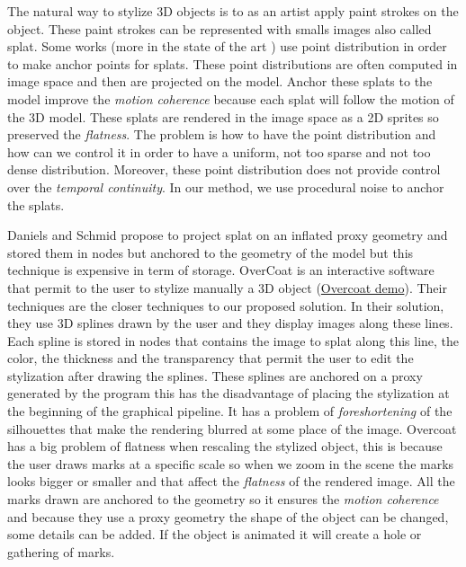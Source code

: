 The natural way to stylize 3D objects is to as an artist apply paint strokes on the object. These paint strokes can be represented with smalls images also called splat. Some works \cite{meier_painterly_1996, Fekete_2000, chi_stylized_2006}(more in the state of the art \cite{benard_state---art_2011}) use point distribution in order to make anchor points for splats. These point distributions are often computed in image space and then are projected on the model. Anchor these splats to the model improve the \textit{motion coherence} because each splat will follow the motion of the 3D model. These splats are rendered in the image space as a 2D sprites so preserved the \textit{flatness}. The problem is how to have the point distribution and how can we control it in order to have a uniform, not too sparse and not too dense distribution. Moreover, these point distribution does not provide control over the \textit{temporal continuity}. In our method, we use procedural noise to anchor the splats.

Daniels\cite{Daniels_1999} and Schmid\cite{schmid_overcoat:_2011} propose to project splat on an inflated proxy geometry and stored them in nodes but anchored to the geometry of the model but this technique is expensive in term of storage. OverCoat\cite{schmid_overcoat:_2011} is an interactive software that permit to the user to stylize manually a 3D object (\href{https://www.youtube.com/watch?v=Nfw6JxC9Fw4}{Overcoat demo}). Their techniques are the closer techniques to our proposed solution. In their solution, they use 3D splines drawn by the user and they display images along these lines. Each spline is stored in nodes that contains the image to splat along this line, the color, the thickness and the transparency that permit the user to edit the stylization after drawing the splines. These splines are anchored on a proxy generated by the program this has the disadvantage of placing the stylization at the beginning of the graphical pipeline. It has a problem of \textit{foreshortening} of the silhouettes that make the rendering blurred at some place of the image. Overcoat has a big problem of flatness when rescaling the stylized object, this is because the user draws marks at a specific scale so when we zoom in the scene the marks looks bigger or smaller and that affect the \textit{flatness} of the rendered image. All the marks drawn are anchored to the geometry so it ensures the \textit{motion coherence} and because they use a proxy geometry the shape of the object can be changed, some details can be added. If the object is animated it will create a hole or gathering of marks.

